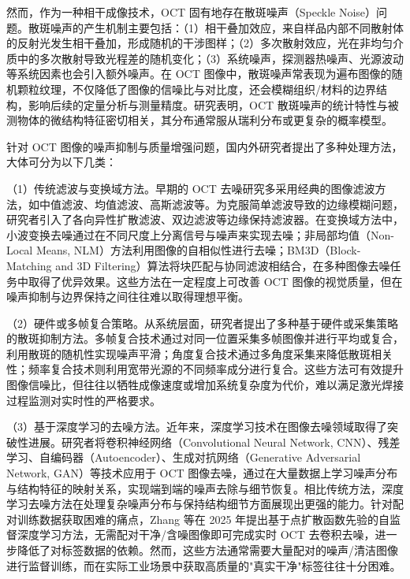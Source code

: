 然而，作为一种相干成像技术，OCT 固有地存在散斑噪声（Speckle Noise）问题。散斑噪声的产生机制主要包括：（1）相干叠加效应，来自样品内部不同散射体的反射光发生相干叠加，形成随机的干涉图样；（2）多次散射效应，光在非均匀介质中的多次散射导致光程差的随机变化；（3）系统噪声，探测器热噪声、光源波动等系统因素也会引入额外噪声。在 OCT 图像中，散斑噪声常表现为遍布图像的随机颗粒纹理，不仅降低了图像的信噪比与对比度，还会模糊组织/材料的边界结构，影响后续的定量分析与测量精度。研究表明，OCT 散斑噪声的统计特性与被测物体的微结构特征密切相关，其分布通常服从瑞利分布或更复杂的概率模型。

针对 OCT 图像的噪声抑制与质量增强问题，国内外研究者提出了多种处理方法，大体可分为以下几类：

（1）传统滤波与变换域方法。早期的 OCT 去噪研究多采用经典的图像滤波方法，如中值滤波、均值滤波、高斯滤波等。为克服简单滤波导致的边缘模糊问题，研究者引入了各向异性扩散滤波、双边滤波等边缘保持滤波器。在变换域方法中，小波变换去噪通过在不同尺度上分离信号与噪声来实现去噪；非局部均值（Non-Local Means, NLM）方法利用图像的自相似性进行去噪；BM3D（Block-Matching and 3D Filtering）算法将块匹配与协同滤波相结合，在多种图像去噪任务中取得了优异效果。这些方法在一定程度上可改善 OCT 图像的视觉质量，但在噪声抑制与边界保持之间往往难以取得理想平衡。

（2）硬件或多帧复合策略。从系统层面，研究者提出了多种基于硬件或采集策略的散斑抑制方法。多帧复合技术通过对同一位置采集多帧图像并进行平均或复合，利用散斑的随机性实现噪声平滑；角度复合技术通过多角度采集来降低散斑相关性；频率复合技术则利用宽带光源的不同频率成分进行复合。这些方法可有效提升图像信噪比，但往往以牺牲成像速度或增加系统复杂度为代价，难以满足激光焊接过程监测对实时性的严格要求。

（3）基于深度学习的去噪方法。近年来，深度学习技术在图像去噪领域取得了突破性进展。研究者将卷积神经网络（Convolutional Neural Network, CNN）、残差学习、自编码器（Autoencoder）、生成对抗网络（Generative Adversarial Network, GAN）等技术应用于 OCT 图像去噪，通过在大量数据上学习噪声分布与结构特征的映射关系，实现端到端的噪声去除与细节恢复。相比传统方法，深度学习去噪方法在处理复杂噪声分布与保持结构细节方面展现出更强的能力。针对配对训练数据获取困难的痛点，Zhang 等在 2025 年提出基于点扩散函数先验的自监督深度学习方法，无需配对干净/含噪图像即可完成实时 OCT 去卷积去噪，进一步降低了对标签数据的依赖。然而，这些方法通常需要大量配对的噪声/清洁图像进行监督训练，而在实际工业场景中获取高质量的"真实干净"标签往往十分困难。

